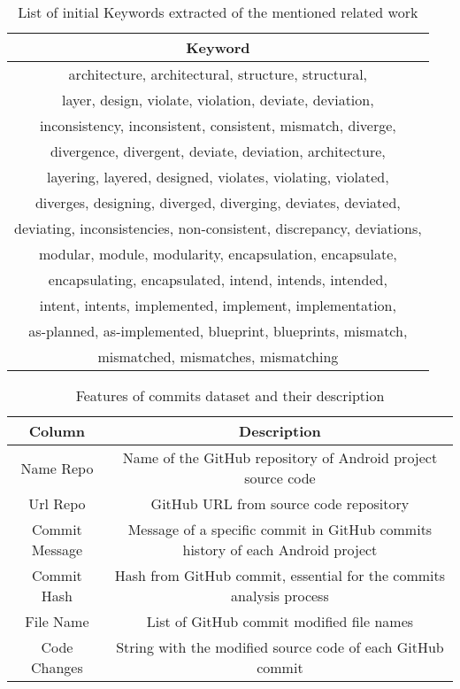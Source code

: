 \begin{table}[H]
    \centering
    \begin{tabular}{|c|}
        \hline
        Keyword \\
        \hline
         architecture, architectural, structure, structural, \\
         layer, design, violate, violation, deviate, deviation,\\
         inconsistency, inconsistent, consistent, mismatch, diverge,\\
         divergence, divergent, deviate, deviation, architecture,\\
         layering, layered, designed, violates, violating, violated,\\
         diverges, designing, diverged, diverging, deviates, deviated, \\
         deviating, inconsistencies, non-consistent, discrepancy, deviations, \\
         modular, module, modularity, encapsulation, encapsulate, \\
         encapsulating, encapsulated, intend, intends, intended, \\
         intent, intents, implemented, implement, implementation,\\
         as-planned, as-implemented, blueprint, blueprints, mismatch,\\
         mismatched, mismatches, mismatching\\
         \hline
    \end{tabular}
    \caption{List of initial Keywords extracted of the mentioned related work}
    \label{tab:my_label}
\end{table}

\begin{table}[H]
    \centering
    \begin{tabular}{|c|c|}
        \hline
        Column & Description \\
        \hline
        Name Repo & Name of the GitHub repository of Android project source code \\
        \hline
        Url Repo & GitHub URL from source code repository \\
        \hline
       Commit Message & Message of a specific commit in GitHub commits history of each Android project \\
       \hline
       Commit Hash & Hash from GitHub commit, essential for the commits analysis process \\
       \hline
       File Name & List of GitHub commit modified file names \\
       \hline
       Code Changes & String with the modified source code of each GitHub commit \\
       \hline
    \end{tabular}
    \caption{Features of commits dataset and their description}
    \label{tab:my_label}
\end{table}

